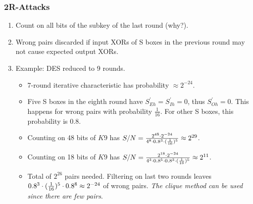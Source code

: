 \documentclass{beamer}
\begin{document}
    \begin{frame}
        \frametitle{2R-Attacks}
        \begin{enumerate}
            \item<1-> Count on all bits of the subkey of the last round (why?).
            \item<2-> Wrong pairs discarded if input XORs of S boxes in the
            previous round may not cause expected output XORs.
            \item<3-> Example: DES reduced to 9 rounds.
            \begin{itemize}
                \item<3-> 7-round iterative characteristic has probability
                \(\approx 2^{-24}\).
                \item<4-> Five S boxes in the eighth round have \(S_{Eh}^\prime
                = S_{Ih}^\prime = 0\), thus \(S_{Oh}^\prime = 0\). This happens
                for wrong pairs with probability \(\frac{1}{16}\). For other S
                boxes, this probability is \(0.8\).
                \item<5-> Counting on 48 bits of \(K9\) has \(S/N = \frac{2^{48}
                \cdot 2^{-24}}{4^8 \cdot 0.8^3 \cdot (\frac{1}{16})^5}
                \approx 2^{29}\).
                \item<6-> Counting on 18 bits of \(K9\) has \(S/N = \frac{2^{18}
                \cdot 2^{-24}}{4^3 \cdot 0.8^5 \cdot 0.8^3 \cdot
                (\frac{1}{16})^5} \approx 2^{11}\).
                \item<7-> Total of \(2^{26}\) pairs needed. Filtering on last
                two rounds leaves \(0.8^3 \cdot (\frac{1}{16})^5 \cdot
                0.8^8 \approx 2^{-24}\) of wrong pairs. \emph{The clique method
                can be used since there are few pairs}.
            \end{itemize}
        \end{enumerate}
    \end{frame}
\end{document}
